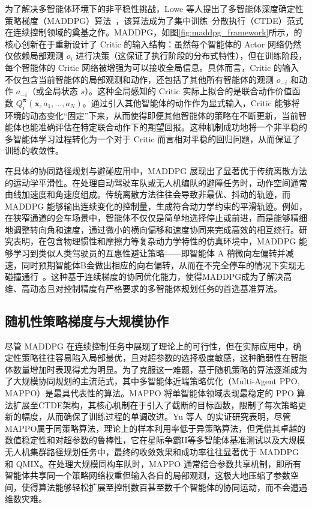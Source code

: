 \documentclass[13.5pt]{extarticle}
\newcommand{\figref}[1]{\hypersetup{linkcolor=red}\ref{#1}}
\begin{document}
为了解决多智能体环境下的非平稳性挑战，Lowe 等人提出了多智能体深度确定性策略梯度（MADDPG）算法~\cite{lowe2017multi}，该算法成为了集中训练–分散执行（CTDE）范式在连续控制领域的奠基之作。MADDPG，如图\figref{fig:maddpg_framework}所示，的核心创新在于重新设计了 Critic 的输入结构：虽然每个智能体的 Actor 网络仍然仅依赖局部观测 $o_i$ 进行决策（这保证了执行阶段的分布式特性），但在训练阶段，每个智能体的 Critic 网络被增强为可以接收全局信息。具体而言，Critic 的输入不仅包含当前智能体的局部观测和动作，还包括了其他所有智能体的观测 $o_{-i}$ 和动作 $a_{-i}$（或全局状态 $s$）。这种全局感知的 Critic 实际上拟合的是联合动作价值函数 $Q_i^{\boldsymbol{\pi}}(\mathbf{x}, a_1, \dots, a_N)$。通过引入其他智能体的动作作为显式输入，Critic 能够将环境的动态变化“固定”下来，从而使得即便其他智能体的策略在不断更新，当前智能体也能准确评估在特定联合动作下的期望回报。这种机制成功地将一个非平稳的多智能体学习过程转化为一个对于 Critic 而言相对平稳的回归问题，从而保证了训练的收敛性。

在具体的协同路径规划与避碰应用中，MADDPG 展现出了显著优于传统离散方法的运动学平滑性。在处理自动驾驶车队或无人机编队的避障任务时，动作空间通常由线加速度和角速度组成。传统离散方法往往会导致非最优、抖动的轨迹，而 MADDPG 能够输出连续变化的控制量，生成符合动力学约束的平滑轨迹。例如，在狭窄通道的会车场景中，智能体不仅仅是简单地选择停止或前进，而是能够精细地调整转向角和速度，通过微小的横向偏移和速度协同来完成高效的相互绕行。研究表明，在包含物理惯性和摩擦力等复杂动力学特性的仿真环境中，MADDPG 能够学习到类似人类驾驶员的互惠性避让策略——即智能体 A 稍微向左偏转并减速，同时预期智能体B会做出相应的向右偏转，从而在不完全停车的情况下实现无碰撞通行~\cite{everett2018motion}。这种基于连续梯度的协同优化能力，使得MADDPG成为了解决高维、高动态且对控制精度有严格要求的多智能体规划任务的首选基准算法。

\subsection{随机性策略梯度与大规模协作}

尽管 MADDPG 在连续控制任务中展现了理论上的可行性，但在实际应用中，确定性策略往往容易陷入局部最优，且对超参数的选择极度敏感，这种脆弱性在智能体数量增加时表现得尤为明显。为了克服这一难题，基于随机策略的算法逐渐成为了大规模协同规划的主流范式，其中多智能体近端策略优化（Multi-Agent PPO, MAPPO）是最具代表性的算法。MAPPO 将单智能体领域表现最稳定的 PPO 算法扩展至CTDE架构，其核心机制在于引入了截断的目标函数，限制了每次策略更新的幅度，从而确保了训练过程的单调改进。Yu 等人~\cite{yu2022surprising}的实证研究表明，尽管MAPPO属于同策略算法，理论上的样本利用率低于异策略算法，但凭借其卓越的数值稳定性和对超参数的鲁棒性，它在星际争霸II等多智能体基准测试以及大规模无人机集群路径规划任务中，最终的收敛效果和成功率往往显著优于 MADDPG 和 QMIX。在处理大规模同构车队时，MAPPO 通常结合参数共享机制，即所有智能体共享同一个策略网络权重但输入各自的局部观测，这极大地压缩了参数空间，使得算法能够轻松扩展至控制数百甚至数千个智能体的协同运动，而不会遭遇维数灾难。
\end{document}
